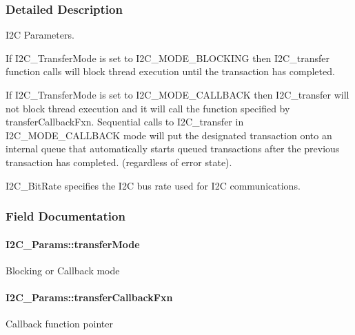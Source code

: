 \subsubsection{Detailed Description}
I2\-C Parameters. 

If I2\-C\-\_\-\-Transfer\-Mode is set to I2\-C\-\_\-\-M\-O\-D\-E\-\_\-\-B\-L\-O\-C\-K\-I\-N\-G then I2\-C\-\_\-transfer function calls will block thread execution until the transaction has completed.

If I2\-C\-\_\-\-Transfer\-Mode is set to I2\-C\-\_\-\-M\-O\-D\-E\-\_\-\-C\-A\-L\-L\-B\-A\-C\-K then I2\-C\-\_\-transfer will not block thread execution and it will call the function specified by transfer\-Callback\-Fxn. Sequential calls to I2\-C\-\_\-transfer in I2\-C\-\_\-\-M\-O\-D\-E\-\_\-\-C\-A\-L\-L\-B\-A\-C\-K mode will put the designated transaction onto an internal queue that automatically starts queued transactions after the previous transaction has completed. (regardless of error state).

I2\-C\-\_\-\-Bit\-Rate specifies the I2\-C bus rate used for I2\-C communications. 

\subsubsection{Field Documentation}
\paragraph[{transfer\-Mode}]{ I2\-C\-\_\-\-Params\-::transfer\-Mode}\label{struct_i2_c___params_a79c5c51380ffbdb21df1dff6cb57de0e}
Blocking or Callback mode 
\paragraph[{transfer\-Callback\-Fxn}]{ I2\-C\-\_\-\-Params\-::transfer\-Callback\-Fxn}\label{struct_i2_c___params_a57edf1b900368904779d0c57a73cf047}
Callback function pointer 
